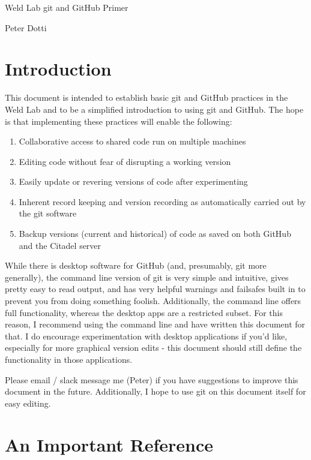 \documentclass[11pt]{article}
\begin{document}
\begin{center}
{\Large Weld Lab git and GitHub Primer}

Peter Dotti
\end{center}

\section{Introduction}

This document is intended to establish basic git and GitHub practices in the Weld Lab and to be a simplified introduction to using git and GitHub.  The hope is that implementing these practices will enable the following:

\begin{enumerate}
\item Collaborative access to shared code run on multiple machines
\item Editing code without fear of disrupting a working version
\item Easily update or revering versions of code after experimenting
\item Inherent record keeping and version recording as automatically carried out by the git software
\item Backup versions (current and historical) of code as saved on both GitHub and the Citadel server
\end{enumerate}

While there is desktop software for GitHub (and, presumably, git more generally), the command line version of git is very simple and intuitive, gives pretty easy to read output, and has very helpful warnings and failsafes built in to prevent you from doing something foolish.  Additionally, the command line offers full functionality, whereas the desktop apps are a restricted subset.  For this reason, I recommend using the command line and have written this document for that.  I do encourage experimentation with desktop applications if you'd like, especially for more graphical version edits - this document should still define the functionality in those applications.

Please email / slack message me (Peter) if you have suggestions to improve this document in the future.  Additionally, I hope to use git on this document itself for easy editing.

\section{An Important Reference}
\end{document}
